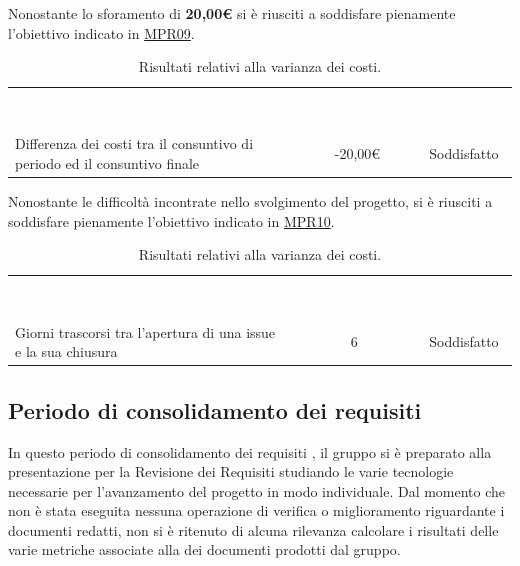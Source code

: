 Nonostante lo sforamento di \textbf{20,00€} si è riusciti a soddisfare pienamente l'obiettivo indicato in \hyperlink{MPR09}{MPR09}.
\begin{table} [H]
	\begin{center}
		\begin{tabular}{|C{6cm}|c|c|}
			\textcolor{white}{\textbf{Processo}}&
			\textcolor{white}{\textbf{Risultato ottenuto}}&
			\textcolor{white}{\textbf{Valutazione}}\\
			Differenza dei costi tra il consuntivo di periodo ed il consuntivo finale & -20,00€ & Soddisfatto\\ \hline
		\end{tabular}
	\end{center}
	\caption{\label{tab:MPR09Analisi}Risultati relativi alla varianza dei costi.}
\end{table}\noindent
Nonostante le difficoltà incontrate nello svolgimento del progetto, si è riusciti a soddisfare pienamente l'obiettivo indicato in \hyperlink{MPR10}{MPR10}.
\begin{table} [H]
	\begin{center}
		\begin{tabular}{|C{6cm}|c|c|}
			\textcolor{white}{\textbf{Processo}}&
			\textcolor{white}{\textbf{Risultato ottenuto}}&
			\textcolor{white}{\textbf{Valutazione}}\\
			Giorni trascorsi tra l'apertura di una issue e la sua chiusura & 6 & Soddisfatto\\ \hline
		\end{tabular}
	\end{center}
	\caption{\label{tab:MPR10Analisi}Risultati relativi alla varianza dei costi.}
\end{table}

\subsection{Periodo di consolidamento dei requisiti}
In questo periodo di consolidamento dei requisiti , il gruppo {\Gruppo} si è preparato alla presentazione per la Revisione dei Requisiti studiando le varie tecnologie necessarie per l'avanzamento del progetto in modo individuale. Dal momento che non è stata eseguita nessuna operazione di verifica o miglioramento riguardante i documenti redatti, non si è ritenuto di alcuna rilevanza calcolare i risultati delle varie metriche associate alla  dei documenti prodotti dal gruppo.
 

